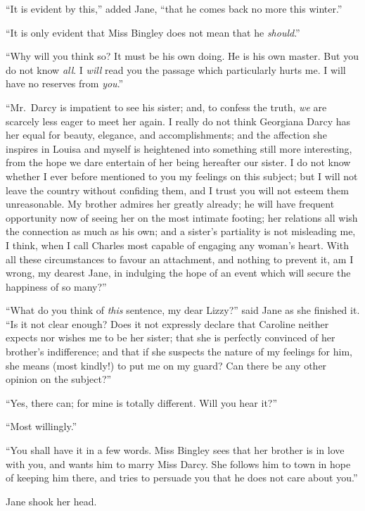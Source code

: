 ``It is evident by this,'' added Jane, ``that he comes back no more
this winter.''

``It is only evident that Miss Bingley does not mean that he
\emph{should}.''

``Why will you think so?  It must be his own doing.  He is his
own master.  But you do not know \emph{all}.  I \emph{will} read you the
passage which particularly hurts me.  I will have no reserves
from \emph{you}.''

``Mr.\ Darcy is impatient to see his sister; and, to confess the
truth, \emph{we} are scarcely less eager to meet her again.  I really do
not think Georgiana Darcy has her equal for beauty, elegance,
and accomplishments; and the affection she inspires in Louisa
and myself is heightened into something still more interesting,
from the hope we dare entertain of her being hereafter our
sister.  I do not know whether I ever before mentioned to you
my feelings on this subject; but I will not leave the country
without confiding them, and I trust you will not esteem them
unreasonable.  My brother admires her greatly already; he will
have frequent opportunity now of seeing her on the most
intimate footing; her relations all wish the connection as much as
his own; and a sister's partiality is not misleading me, I think,
when I call Charles most capable of engaging any woman's
heart.  With all these circumstances to favour an attachment, and
nothing to prevent it, am I wrong, my dearest Jane, in indulging
the hope of an event which will secure the happiness of so many?''

``What do you think of \emph{this} sentence, my dear Lizzy?'' said
Jane as she finished it.  ``Is it not clear enough?  Does it not
expressly declare that Caroline neither expects nor wishes me to
be her sister; that she is perfectly convinced of her brother's
indifference; and that if she suspects the nature of my feelings
for him, she means (most kindly!) to put me on my guard?  Can
there be any other opinion on the subject?''

``Yes, there can; for mine is totally different.  Will you hear it?''

``Most willingly.''

``You shall have it in a few words.  Miss Bingley sees that her
brother is in love with you, and wants him to marry Miss Darcy.
She follows him to town in hope of keeping him there, and tries
to persuade you that he does not care about you.''

Jane shook her head.

